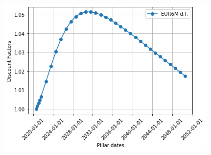 \begin{Answer}
\begin{center}
  \includegraphics{Solutions_files/Solutions_24_0.png}
\end{center}
\end{Answer}




